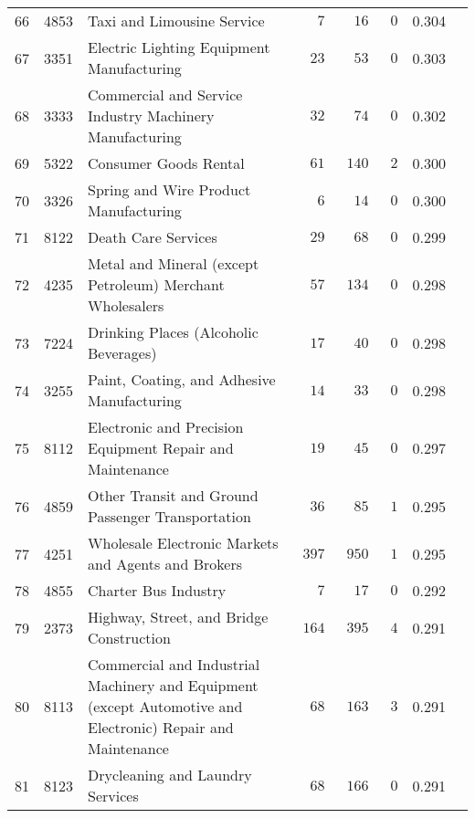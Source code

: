 \documentclass[9pt, oneside]{article}   	%
\begin{document}
\begin{longtable}{lcp{3 in}ccccc}
66  & 4853 & Taxi and Limousine Service & $\phantom{000}7$ & $\phantom{00}16$ & $\phantom{0}0$ & 0.304 \\
67  & 3351 & Electric Lighting Equipment Manufacturing & $\phantom{00}23$ & $\phantom{00}53$ & $\phantom{0}0$ & 0.303 \\
68  & 3333 & Commercial and Service Industry Machinery Manufacturing & $\phantom{00}32$ & $\phantom{00}74$ & $\phantom{0}0$ & 0.302 \\
69  & 5322 & Consumer Goods Rental & $\phantom{00}61$ & $\phantom{0}140$ & $\phantom{0}2$ & 0.300 \\
70  & 3326 & Spring and Wire Product Manufacturing & $\phantom{000}6$ & $\phantom{00}14$ & $\phantom{0}0$ & 0.300 \\
71  & 8122 & Death Care Services & $\phantom{00}29$ & $\phantom{00}68$ & $\phantom{0}0$ & 0.299 \\
72  & 4235 & Metal and Mineral (except Petroleum) Merchant Wholesalers & $\phantom{00}57$ & $\phantom{0}134$ & $\phantom{0}0$ & 0.298 \\
73  & 7224 & Drinking Places (Alcoholic Beverages) & $\phantom{00}17$ & $\phantom{00}40$ & $\phantom{0}0$ & 0.298 \\
74  & 3255 & Paint, Coating, and Adhesive Manufacturing & $\phantom{00}14$ & $\phantom{00}33$ & $\phantom{0}0$ & 0.298 \\
75  & 8112 & Electronic and Precision Equipment Repair and Maintenance & $\phantom{00}19$ & $\phantom{00}45$ & $\phantom{0}0$ & 0.297 \\
76  & 4859 & Other Transit and Ground Passenger Transportation & $\phantom{00}36$ & $\phantom{00}85$ & $\phantom{0}1$ & 0.295 \\
77  & 4251 & Wholesale Electronic Markets and Agents and Brokers & $\phantom{0}397$ & $\phantom{0}950$ & $\phantom{0}1$ & 0.295 \\
78  & 4855 & Charter Bus Industry & $\phantom{000}7$ & $\phantom{00}17$ & $\phantom{0}0$ & 0.292 \\
79  & 2373 & Highway, Street, and Bridge Construction & $\phantom{0}164$ & $\phantom{0}395$ & $\phantom{0}4$ & 0.291 \\
80  & 8113 & Commercial and Industrial Machinery and Equipment (except Automotive and Electronic) Repair and Maintenance & $\phantom{00}68$ & $\phantom{0}163$ & $\phantom{0}3$ & 0.291 \\
81  & 8123 & Drycleaning and Laundry Services & $\phantom{00}68$ & $\phantom{0}166$ & $\phantom{0}0$ & 0.291 \\

\end{longtable}
\end{document}
